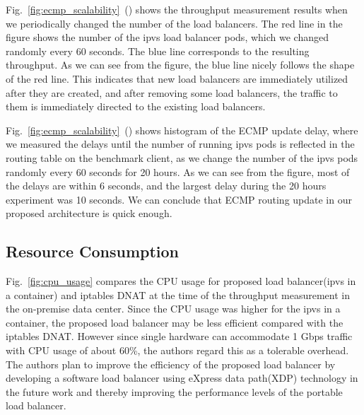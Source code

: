 Fig.~\ref{fig:ecmp_scalability}~() shows the throughput measurement results when we periodically changed the number of the load balancers. 
The red line in the figure shows the number of the ipvs load balancer pods, which we changed randomly every 60 seconds.
The blue line corresponds to the resulting throughput.
As we can see from the figure, the blue line nicely follows the shape of the red line.
This indicates that new load balancers are immediately utilized after they are created, and after removing some load balancers, the traffic to them is immediately directed to the existing load balancers.

Fig.~\ref{fig:ecmp_scalability}~() shows histogram of the ECMP update delay, where we measured the delays until the number of running ipvs pods is reflected in the routing table on the benchmark client, as we change the number of the ipvs pods randomly every 60 seconds for 20 hours.
As we can see from the figure, most of the delays are within 6 seconds, and the largest delay during the 20 hours experiment was 10 seconds.
We can conclude that ECMP routing update in our proposed architecture is quick enough.

\FloatBarrier

\subsection{Resource Consumption}

Fig.~\ref{fig:cpu_usage} compares the CPU usage for proposed load balancer(ipvs in a container) and iptables DNAT at the time of the throughput measurement in the on-premise data center.
Since the CPU usage was higher for the ipvs in a container, the proposed load balancer may be less efficient compared with the iptables DNAT.
However since single hardware can accommodate 1 Gbps traffic with CPU usage of about 60\%, the authors regard this as a tolerable overhead.
The authors plan to improve the efficiency of the proposed load balancer by developing a software load balancer using eXpress data path(XDP) technology\cite{hoiland2018express} in the future work and thereby improving the performance levels of the portable load balancer.

